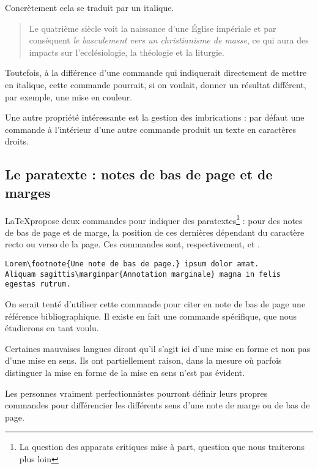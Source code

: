 Concrètement cela se traduit par un italique. 

\begin{quotation}
Le quatrième siècle voit la naissance d'une Église impériale et par conséquent \emph{le basculement vers un christianisme de masse}, ce qui aura des impacts sur l'ecclésiologie, la théologie et la liturgie.
\end{quotation}

Toutefois, à la différence d'une commande qui indiquerait directement de mettre en italique, cette commande pourrait, si on voulait, donner un résultat différent, par exemple, une mise en couleur. 

Une autre propriété intéressante est la gestion des imbrications : par défaut une commande  à l'intérieur d'une autre commande  produit un texte en caractères droits.

\subsection{Le paratexte : notes de bas de page et de marges}

\LaTeX propose deux commandes pour indiquer des paratextes\footnote{La question des apparats critiques mise à part, question que nous traiterons plus loin} : pour des notes de bas de page et de marge, la position de ces dernières dépendant du caractère recto ou verso de la page. Ces commandes sont, respectivement,  et .

\begin{verbatim}
Lorem\footnote{Une note de bas de page.} ipsum dolor amat.
Aliquam sagittis\marginpar{Annotation marginale} magna in felis egestas rutrum.
\end{verbatim}

\begin{attention}
	On serait tenté d'utiliser cette commande pour citer en note de bas de page une référence bibliographique. Il existe en fait une commande spécifique, que nous étudierons en tant voulu.
\end{attention}
\begin{attention}
	Certaines mauvaises langues diront qu'il s'agit ici d'une mise en forme et non pas d'une mise en sens. Ils ont partiellement raison, dans la mesure où parfois distinguer la mise en forme de la mise en sens n'est pas évident.
	
	Les personnes vraiment perfectionnistes pourront définir leurs propres commandes pour différencier les différents sens d'une note de marge ou de bas de page.
\end{attention}

